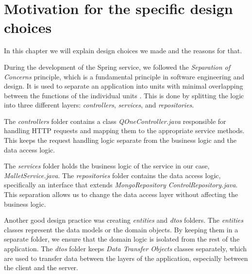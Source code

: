 \section{Motivation for the specific design choices}
\label{ch:motivation}

In this chapter we will explain design choices we made and the reasons for that.

During the development of the Spring service, we followed the \textit{Separation of Concerns} principle, which is a
fundamental principle in software engineering and design. It is used to separate an application into units with
minimal overlapping between the functions of the individual units \cite{geeksforgeeks:soc}. This is done by splitting
the logic into three different layers: \textit{controllers}, \textit{services}, and \textit{repositories}.

The \textit{controllers} folder contains a class \textit{QOneController.java} responsible for handling HTTP requests
and mapping them to the appropriate service methods. This keeps the request handling logic separate from the business
logic and the data access logic.

The \textit{services} folder holds the business logic of the service in our case, \textit{MalletService.java}. The
\textit{repositories} folder contains the data access logic, specifically an interface that extends
\textit{MongoRepository} \textit{ControlRepository.java}. This separation allows us to change the data access layer
without affecting the business logic.

Another good design practice was creating \textit{entities} and \textit{dtos} folders. The \textit{entities} classes
represent the data models or the domain objects. By keeping them in a separate folder, we ensure that the domain logic
is isolated from the rest of the application. The \textit{dtos} folder keeps \textit{Data Transfer Objects} classes
separately, which are used to transfer data between the layers of the application, especially between the client and the server.
